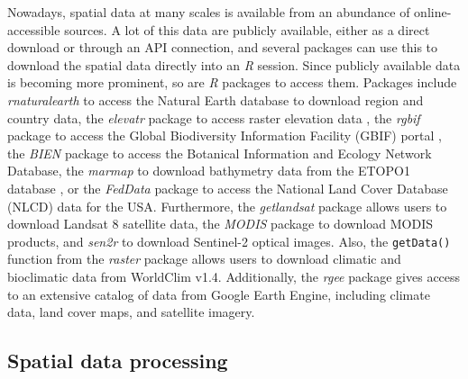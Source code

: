 \documentclass[smallextended]{svjour3}       %
\begin{document}
Nowadays, spatial data at many scales is available from an abundance of online-accessible sources.
A lot of this data are publicly available, either as a direct download or through an API connection, and several packages can use this to download the spatial data directly into an \emph{R} session.
Since publicly available data is becoming more prominent, so are \emph{R} packages to access them.
Packages include \emph{rnaturalearth} \cite{South2017} to access the Natural Earth database to download region and country data, the \emph{elevatr} package to access raster elevation data \cite{Hollister2020}, the \emph{rgbif} package to access the Global Biodiversity Information Facility (GBIF) portal \cite{Chamberlain2017}, the \emph{BIEN} package \cite{Maitner2020} to access the Botanical Information and Ecology Network Database, the \emph{marmap} to download bathymetry data from the ETOPO1 database \cite{Pante2013}, or the \emph{FedData} package \cite{Bocinsky2019} to access the National Land Cover Database (NLCD) data for the USA.
Furthermore, the \emph{getlandsat} package \cite{Chamberlain2018} allows users to download Landsat 8 satellite data, the \emph{MODIS} package \cite{Mattiuzzi2020} to download MODIS products, and \emph{sen2r} \cite{Ranghetti2020} to download Sentinel-2 optical images.
Also, the \texttt{getData()} function from the \emph{raster} package allows users to download climatic and bioclimatic data from WorldClim v1.4.
Additionally, the \emph{rgee} package \cite{Aybar2020} gives access to an extensive catalog of data from Google Earth Engine, including climate data, land cover maps, and satellite imagery.

\hypertarget{spatial-data-processing}{%
\subsection{Spatial data processing}\label{spatial-data-processing}}
\end{document}
